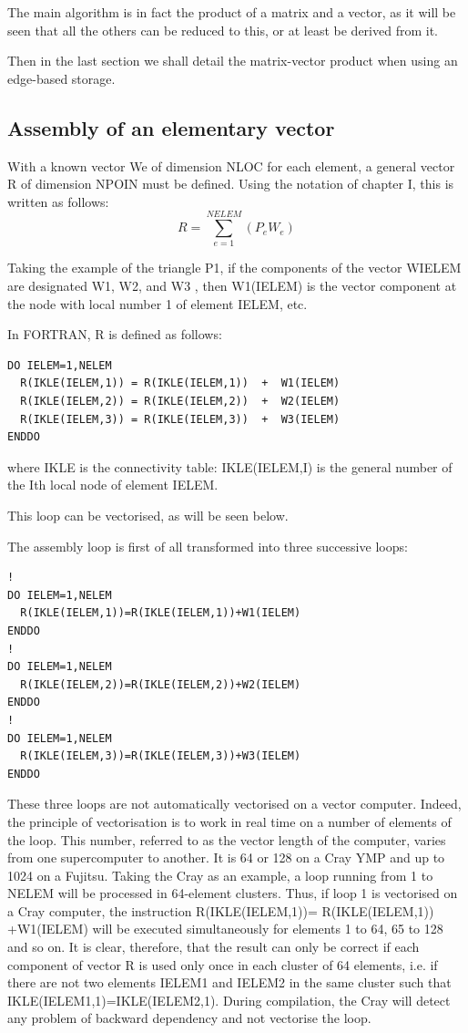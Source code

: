The main algorithm is in fact the product of a matrix and a vector, as it will
be seen that all the others can be reduced to this, or at least be derived from
it.

Then in the last section we shall detail the matrix-vector product when using
an edge-based storage.

\subsection{Assembly of an elementary vector}

With a known vector We of dimension NLOC for each element, a general vector R
of dimension NPOIN must be defined. Using the notation of chapter I, this is
written as follows:
\[R=\sum _{e=1}^{NELEM}(P_{e} W_{e} ) \]

Taking the example of the triangle P1, if the components of the vector WIELEM
are designated W1, W2, and W3 , then W1(IELEM) is the vector component at the
node with local number 1 of element IELEM, etc.

In FORTRAN, R is defined as follows:

\begin{lstlisting}[language=TelFortran]
DO IELEM=1,NELEM
  R(IKLE(IELEM,1)) = R(IKLE(IELEM,1))  +  W1(IELEM)
  R(IKLE(IELEM,2)) = R(IKLE(IELEM,2))  +  W2(IELEM)
  R(IKLE(IELEM,3)) = R(IKLE(IELEM,3))  +  W3(IELEM)
ENDDO
\end{lstlisting}

where IKLE is the connectivity table: IKLE(IELEM,I) is the general number of
the Ith local node of element IELEM.

This loop can be vectorised, as will be seen below.

The assembly loop is first of all transformed into three successive loops:

\begin{lstlisting}[language=TelFortran]
!
DO IELEM=1,NELEM
  R(IKLE(IELEM,1))=R(IKLE(IELEM,1))+W1(IELEM)
ENDDO
!
DO IELEM=1,NELEM
  R(IKLE(IELEM,2))=R(IKLE(IELEM,2))+W2(IELEM)
ENDDO
!
DO IELEM=1,NELEM
  R(IKLE(IELEM,3))=R(IKLE(IELEM,3))+W3(IELEM)
ENDDO
\end{lstlisting}

These three loops are not automatically vectorised on a vector computer.
Indeed, the principle of vectorisation is to work in real time on a number of
elements of the loop. This number, referred to as the vector length of the
computer, varies from one supercomputer to another. It is 64 or 128 on a Cray
YMP and up to 1024 on a Fujitsu. Taking the Cray as an example, a loop running
from 1 to NELEM will be processed in 64-element clusters. Thus, if loop 1 is
vectorised on a Cray computer, the instruction R(IKLE(IELEM,1))=
R(IKLE(IELEM,1)) +W1(IELEM) will be executed simultaneously for elements 1 to
64, 65 to 128 and so on. It is clear, therefore, that the result can only be
correct if each component of vector R is used only once in each cluster of 64
elements, i.e. if there are not two elements IELEM1 and IELEM2 in the same
cluster such that IKLE(IELEM1,1)=IKLE(IELEM2,1). During compilation, the Cray
will detect any problem of backward dependency and not vectorise the loop.

